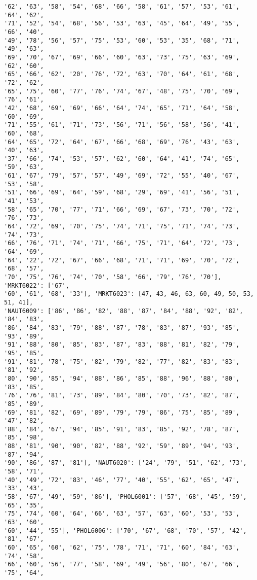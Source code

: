 \documentclass[11pt]{article}
\begin{document}
\begin{Verbatim}[commandchars=\\\{\}]
'62', '63', '58', '54', '68', '66', '58', '61', '57', '53', '61', '64', '62',
'71', '52', '54', '68', '56', '53', '63', '45', '64', '49', '55', '66', '40',
'49', '78', '56', '57', '75', '53', '60', '53', '35', '68', '71', '49', '63',
'69', '70', '67', '69', '66', '60', '63', '73', '75', '63', '69', '62', '60',
'65', '66', '62', '20', '76', '72', '63', '70', '64', '61', '68', '72', '62',
'65', '75', '60', '77', '76', '74', '67', '48', '75', '70', '69', '76', '61',
'42', '68', '69', '69', '66', '64', '74', '65', '71', '64', '58', '60', '69',
'71', '55', '61', '71', '73', '56', '71', '56', '58', '56', '41', '60', '68',
'64', '65', '72', '64', '67', '66', '68', '69', '76', '43', '63', '40', '63',
'37', '66', '74', '53', '57', '62', '60', '64', '41', '74', '65', '59', '63',
'61', '67', '79', '57', '57', '49', '69', '72', '55', '40', '67', '53', '58',
'51', '66', '69', '64', '59', '68', '29', '69', '41', '56', '51', '41', '53',
'58', '65', '70', '77', '71', '66', '69', '67', '73', '70', '72', '76', '73',
'64', '72', '69', '70', '75', '74', '71', '75', '71', '74', '73', '74', '73',
'66', '76', '71', '74', '71', '66', '75', '71', '64', '72', '73', '64', '69',
'64', '22', '72', '67', '66', '68', '71', '71', '69', '70', '72', '68', '57',
'70', '75', '76', '74', '70', '58', '66', '79', '76', '70'], 'MRKT6022': ['67',
'60', '61', '68', '33'], 'MRKT6023': [47, 43, 46, 63, 60, 49, 50, 53, 51, 41],
'NAUT6009': ['86', '86', '82', '88', '87', '84', '88', '92', '82', '84', '83',
'86', '84', '83', '79', '88', '87', '78', '83', '87', '93', '85', '93', '89',
'91', '88', '80', '85', '83', '87', '83', '88', '81', '82', '79', '95', '85',
'91', '81', '78', '75', '82', '79', '82', '77', '82', '83', '83', '81', '92',
'80', '90', '85', '94', '88', '86', '85', '88', '96', '88', '80', '83', '85',
'76', '76', '81', '73', '89', '84', '80', '70', '73', '82', '87', '85', '89',
'69', '81', '82', '69', '89', '79', '79', '86', '75', '85', '89', '47', '82',
'88', '84', '67', '94', '85', '91', '83', '85', '92', '78', '87', '85', '98',
'88', '81', '90', '90', '82', '88', '92', '59', '89', '94', '93', '87', '94',
'90', '86', '87', '81'], 'NAUT6020': ['24', '79', '51', '62', '73', '58', '71',
'40', '49', '72', '83', '46', '77', '40', '55', '62', '65', '47', '33', '43',
'58', '67', '49', '59', '86'], 'PHOL6001': ['57', '68', '45', '59', '65', '35',
'75', '74', '60', '64', '66', '63', '57', '63', '60', '53', '53', '63', '60',
'60', '44', '55'], 'PHOL6006': ['70', '67', '68', '70', '57', '42', '81', '67',
'60', '65', '60', '62', '75', '78', '71', '71', '60', '84', '63', '74', '58',
'66', '60', '56', '77', '58', '69', '49', '56', '80', '67', '66', '75', '64',

\end{Verbatim}
\end{document}
